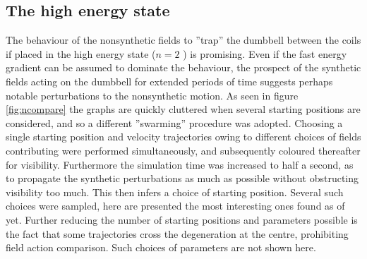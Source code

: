 \documentclass[main.tex]{subfiles}
\begin{document}
\subsection{The high energy state}\label{sec:reshigh}
The behaviour of the nonsynthetic fields to ''trap'' the dumbbell between the coils if
placed in the high energy state (\(n = 2\) ) is promising. Even if the fast energy gradient can be
assumed to dominate the behaviour, the prospect of the synthetic fields acting on the
dumbbell for extended periods of time suggests perhaps notable perturbations to the
nonsynthetic motion. As seen in figure \ref{fig:ncompare} the graphs are quickly cluttered
when several starting positions are considered, and so a different ''swarming''
procedure was adopted. Choosing a single starting position and velocity trajectories owing
to different choices of fields contributing were performed simultaneously, and subsequently
coloured thereafter for visibility. Furthermore the simulation time was increased to half a
second, as to propagate the synthetic perturbations as much as possible without obstructing
visibility too much. This then infers a choice of starting position. Several such choices were sampled, here are
presented the most interesting ones found as of yet. Further reducing the number of
starting positions and parameters possible is the fact that some trajectories cross the
degeneration at the centre, prohibiting field action comparison. Such choices of parameters
are not shown here. 
\end{document}
